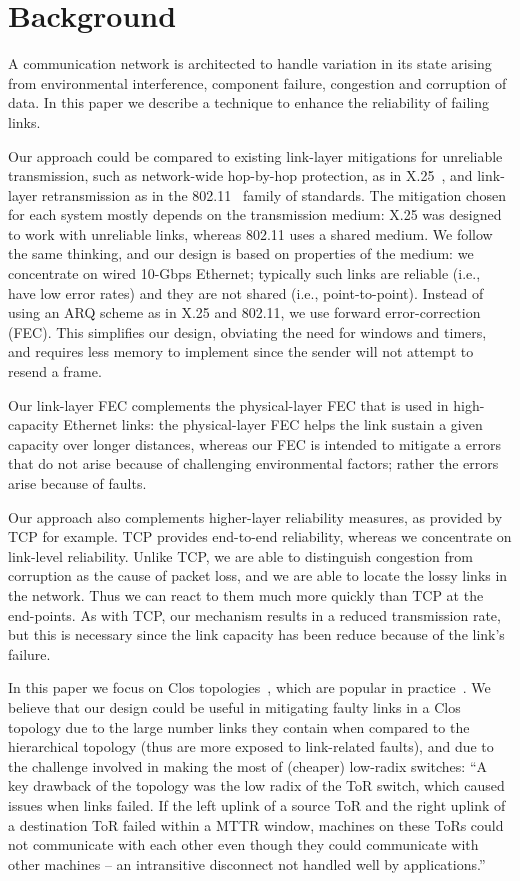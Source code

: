 \section{Background}
A communication network is architected to handle variation in its state
arising from environmental interference, component failure, congestion and
corruption of data. In this paper we describe a technique to enhance the
reliability of failing links.

Our approach could be compared to existing link-layer mitigations for
unreliable transmission, such as network-wide hop-by-hop protection, as in
X.25~\cite{X25}, and link-layer retransmission as in the 802.11~\cite{WiFi} family of
standards. The mitigation chosen for each system mostly depends on
the transmission medium: X.25 was designed to work with unreliable links,
whereas 802.11 uses a shared medium. We follow the same thinking,
and our design is based on properties of the medium: we concentrate on wired
10-Gbps Ethernet; typically such links are reliable (i.e., have low error
rates) and they are not shared (i.e., point-to-point).
Instead of using an ARQ scheme as in X.25 and 802.11, we use forward
error-correction (FEC). This simplifies our design, obviating the need for
windows and timers, and requires less memory to implement since the sender
will not attempt to resend a frame.

Our link-layer FEC complements the physical-layer FEC that is used in
high-capacity Ethernet links: the physical-layer FEC helps the link sustain a
given capacity over longer distances, whereas our FEC is intended to mitigate
a errors that do not arise because of challenging environmental factors; rather
the errors arise because of faults.

Our approach also complements higher-layer reliability measures, as provided by
TCP for example.  TCP provides end-to-end reliability, whereas we concentrate
on link-level reliability. Unlike TCP, we are able to distinguish congestion
from corruption as the cause of packet loss, and we are able to locate the
lossy links in the network. Thus we can react to them much more quickly than
TCP at the end-points. As with TCP, our mechanism results in a reduced
transmission rate, but this is necessary since the link capacity has been
reduce because of the link's failure.

In this paper we focus on Clos
topologies~\cite{Al-Fares:2008:SCD:1402946.1402967}, which are popular in
practice~\cite[\S3.1]{Singh:2016:JRD:2991470.2975159}.
We believe that our design could be useful in mitigating faulty links in a Clos
topology due to the large number links they contain when compared to the
hierarchical topology (thus are more exposed to link-related faults), and due
to the challenge involved in making the most of (cheaper) low-radix switches:
``A key drawback of the topology was the low radix of
the ToR switch, which caused issues when links failed.
If the left uplink of a source ToR and the right uplink
of  a  destination  ToR  failed  within  a  MTTR  window,
machines  on  these  ToRs  could  not  communicate  with
each other even though they could communicate with
other machines -- an intransitive disconnect not handled
well by applications.''~\cite[\S3.1]{Singh:2016:JRD:2991470.2975159}

